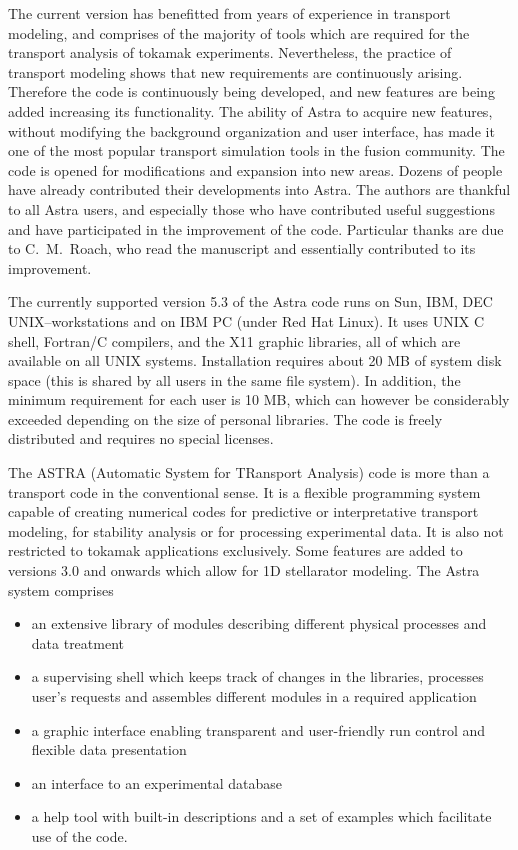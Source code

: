 The current version has benefitted from years of experience in transport
modeling, and comprises of the majority of tools which are required for
the transport analysis of tokamak experiments. 
Nevertheless, the practice of transport modeling shows that new
requirements are continuously arising.  
Therefore the code is continuously being developed, and new features are
being added increasing its functionality. 
The ability of Astra to acquire new features, without modifying the
background organization and user interface, has made it one of
the most popular transport simulation tools in the fusion community. 
The code is opened for modifications and expansion into new areas. 
Dozens of people have already contributed their developments into
Astra.
The authors are thankful to all Astra users, and especially those who
have contributed useful suggestions and have participated in the
improvement of the code. 
Particular thanks are due to C.~M.~Roach, who read the manuscript and 
essentially contributed to its improvement. 

The currently supported version 5.3 of the Astra code runs on Sun, IBM,
DEC UNIX--workstations and on IBM PC (under Red Hat Linux). 
It uses UNIX C shell, Fortran/C compilers, and the X11 graphic libraries,
all of which are available on all UNIX systems. 
Installation requires about 20 MB of system disk space (this is shared
by all users in the same file system). 
In addition, the minimum requirement for each user is 10 MB, which can
however be considerably exceeded depending on the size of personal
libraries. 
The code is freely distributed and requires no special licenses.

The ASTRA (Automatic System for TRansport Analysis) code is more than a
transport code in the conventional sense. 
It is a flexible programming system capable of creating numerical codes
for predictive or interpretative transport modeling, for stability
analysis or for processing experimental data. 
It is also not restricted to tokamak applications exclusively.
Some features are added to versions 3.0 and onwards which allow for 1D
stellarator modeling.  
The Astra system comprises
\begin{itemize}
\item[--] an extensive library of modules describing different physical
processes and data treatment
\item[--] a supervising shell which keeps track of changes in the
libraries, processes user's requests and assembles different modules in
a required application 
\item[--] a graphic interface enabling transparent and user-friendly run
control and flexible data presentation
\item[--] an interface to an experimental database
\item[--] a help tool with built-in descriptions and a set of examples
which facilitate use of the code. 
\end{itemize}

